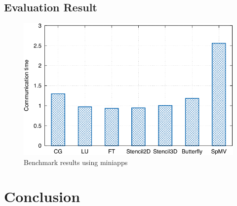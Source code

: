 \documentclass[graybox]{svmult}
\begin{document}
\subsection{Evaluation Result}

\begin{figure}
    \centering
    \includegraphics{benchmark_result}
    \caption{Benchmark results using miniapps}%
    \label{kt:fig:benchmark}
\end{figure}

\section{Conclusion}



\end{document}
